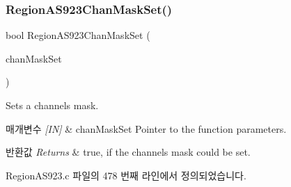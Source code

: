 \subsubsection{\texorpdfstring{Region\+A\+S923\+Chan\+Mask\+Set()}{RegionAS923ChanMaskSet()}}
{\footnotesize\ttfamily bool Region\+A\+S923\+Chan\+Mask\+Set (\begin{DoxyParamCaption}\item[{\mbox{\hyperlink{group___r_e_g_i_o_n_ga6d24f7da136006410827dfb29f6b9b9e}{Chan\+Mask\+Set\+Params\+\_\+t}} $\ast$}]{chan\+Mask\+Set }\end{DoxyParamCaption})}



Sets a channels mask. 


\begin{DoxyParams}{매개변수}
{\em \mbox{[}\+I\+N\mbox{]}} & chan\+Mask\+Set Pointer to the function parameters.\\
\hline
\end{DoxyParams}

\begin{DoxyRetVals}{반환값}
{\em Returns} & true, if the channels mask could be set. \\
\hline
\end{DoxyRetVals}


Region\+A\+S923.\+c 파일의 478 번째 라인에서 정의되었습니다.


